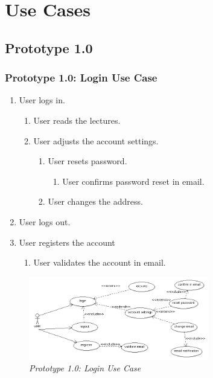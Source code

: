\documentclass[12pt,twoside,a4paper]{report}
\begin{document}
\section{Use Cases}\label{3.5}

\subsection{Prototype 1.0}\label{3.5.1}

\subsubsection{Prototype 1.0: Login Use Case}\label{3.5.1.1}

\begin{enumerate}
\item User logs in.
    \begin{enumerate}
    \item User reads the lectures.
    \item User adjusts the account settings.
     	\begin{enumerate}
     	\item User resets password.
     		\begin{enumerate}
     		\item User confirms password reset in email.
     		\end{enumerate}
     	\item User changes the address.
     	\end{enumerate}
   \end{enumerate}
\item User logs out.
\item User registers the account
   	\begin{enumerate}
    \item User validates the account in email.
   	\end{enumerate}
\end{enumerate}

\begin{figure}[!ht]
	\centering
		\includegraphics[width=0.7\textwidth, totalheight=5cm]{login_use_case}
	\caption{\textit{Prototype 1.0: Login Use Case}}
	\label{f3.5.1.1}
\end{figure}
\end{document}
